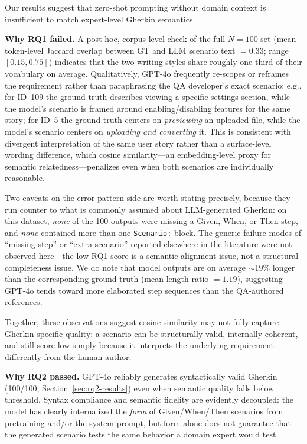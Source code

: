 Our results suggest that zero-shot prompting without domain context is insufficient to match expert-level Gherkin semantics.

\textbf{Why RQ1 failed.}
A post-hoc, corpus-level check of the full $N{=}100$ set (mean token-level Jaccard overlap between GT and LLM scenario text $= 0.33$; range $[0.15, 0.75]$) indicates that the two writing styles share roughly one-third of their vocabulary on average.
Qualitatively, GPT-4o frequently re-scopes or reframes the requirement rather than paraphrasing the QA developer's exact scenario: e.g., for ID~109 the ground truth describes viewing a specific settings section, while the model's scenario is framed around enabling/disabling features for the same story; for ID~5 the ground truth centers on \emph{previewing} an uploaded file, while the model's scenario centers on \emph{uploading and converting} it.
This is consistent with divergent interpretation of the same user story rather than a surface-level wording difference, which cosine similarity---an embedding-level proxy for semantic relatedness---penalizes even when both scenarios are individually reasonable.

Two caveats on the error-pattern side are worth stating precisely, because they run counter to what is commonly assumed about LLM-generated Gherkin: on this dataset, \emph{none} of the 100 outputs were missing a Given, When, or Then step, and \emph{none} contained more than one \texttt{Scenario:} block.
The generic failure modes of ``missing step'' or ``extra scenario'' reported elsewhere in the literature were not observed here---the low RQ1 score is a semantic-alignment issue, not a structural-completeness issue.
We do note that model outputs are on average $\sim$19\% longer than the corresponding ground truth (mean length ratio $= 1.19$), suggesting GPT-4o tends toward more elaborated step sequences than the QA-authored references.

Together, these observations suggest cosine similarity may not fully capture Gherkin-specific quality: a scenario can be structurally valid, internally coherent, and still score low simply because it interprets the underlying requirement differently from the human author.

\textbf{Why RQ2 passed.}
GPT-4o reliably generates syntactically valid Gherkin (100/100, Section~\ref{sec:rq2-results}) even when semantic quality falls below threshold.
Syntax compliance and semantic fidelity are evidently decoupled: the model has clearly internalized the \emph{form} of Given/When/Then scenarios from pretraining and/or the system prompt, but form alone does not guarantee that the generated scenario tests the same behavior a domain expert would test.

